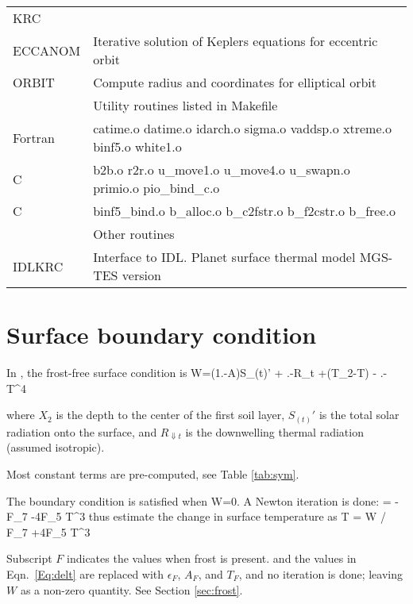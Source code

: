 \documentclass{article}
\begin{document}
\begin{table}
\begin{center}
\begin{tabular}{ l l}
KRC \\
ECCANOM &  Iterative solution of Keplers equations for eccentric orbit \\
ORBIT &  Compute radius and coordinates for elliptical orbit \\
 & \hcm3 Utility routines listed in Makefile \hcm3\\
Fortran & catime.o datime.o idarch.o sigma.o vaddsp.o xtreme.o binf5.o white1.o \\
C &  b2b.o r2r.o u\_move1.o u\_move4.o u\_swapn.o primio.o pio\_bind\_c.o \\
C &  binf5\_bind.o b\_alloc.o b\_c2fstr.o b\_f2cstr.o b\_free.o \\
 & \hcm3 Other routines \hcm3\\
IDLKRC  &  Interface to IDL. Planet surface thermal model  MGS-TES version \\
\end{tabular} \end{center}
\end{table}


\section{Surface boundary condition} %
In , the frost-free surface condition is
\qb W=(1.-A)S_{(t)}'  + .-\alpha \qr \epsilon R_{\Downarrow t}
+(T_2-T) - .-\alpha \qr \epsilon\sigma T^4 \qe

where $X_2$ is the depth to the center of the first soil layer, $S_{(t)}'$ is
the total solar radiation onto the surface, and $ R_{\Downarrow t}$ is the
downwelling thermal radiation (assumed isotropic).

Most constant terms are pre-computed, see Table \ref{tab:sym}.

The boundary condition is satisfied when W=0. A Newton iteration is done:
\qb {} = -F_7 -4F_5 T^3 \qe
thus estimate the change in surface temperature as 
\qbn \Delta T = W / \ql F_7 +4F_5 T^3\qr \label{Eq:delt} \qen


Subscript $F$ indicates the values when frost is present. and the values in
Eqn.~\ref{Eq:delt} are replaced with $\epsilon_F$, $A_F$, and $T_F$, and no
iteration is done; leaving $W$ as a non-zero quantity. See Section
\ref{sec:frost}.

\end{document}
